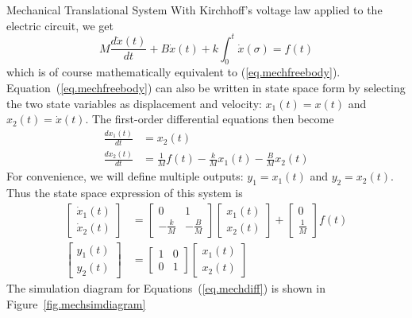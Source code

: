 \begin{casestudy}{Mechanical Translational System}
With Kirchhoff's voltage law applied to the electric circuit, we get
\begin{equation}
    M\frac{d\dot{x}(t)}{dt} + B\dot{x}(t) + k\int_0^t \dot{x}(\sigma) = f(t)
\end{equation}
which is of course mathematically equivalent to (\ref{eq.mechfreebody}).  Equation~(\ref{eq.mechfreebody}) can also be written in state space form by selecting the two state variables as displacement and velocity: $x_1(t)=x(t)$ and $x_2(t) = \dot{x}(t)$.  The first-order differential equations then become
\begin{equation} \label{eq.mechdiff}
\begin{split}
    \frac{dx_1(t)}{dt} & = x_2(t) \\
    \frac{dx_2(t)}{dt} & = \frac{1}{M}f(t) - \frac{k}{M}x_1(t) - \frac{B}{M}x_2(t)
\end{split}
\end{equation}
For convenience, we will define multiple outputs: $y_1 = x_1(t)$ and $y_2 = x_2(t)$.  Thus the state space expression of this system is
\begin{equation}
\begin{split}
    \left[ \begin{array}{c} \dot{x}_1(t) \\ \dot{x}_2(t) \end{array} \right]
    & = 
    \left[ \begin{array}{cc} 0 & 1 \\ -\frac{k}{M} & -\frac{B}{M} \end{array}
        \right]
    \left[ \begin{array}{c} x_1(t) \\ x_2(t) \end{array} \right]
    +
    \left[ \begin{array}{c} 0\\ \frac{1}{M} \end{array} \right]
    f(t)
    \\
    \left[ \begin{array}{c} y_1(t) \\ y_2(t) \end{array} \right]
    & =
    \left[ \begin{array}{cc} 1&0\\0&1 \end{array} \right]
    \left[ \begin{array}{c} x_1(t) \\ x_2(t) \end{array} \right]
\end{split}
\end{equation}
The simulation diagram for Equations~(\ref{eq.mechdiff}) is shown in Figure~\ref{fig.mechsimdiagram}


\end{casestudy}
